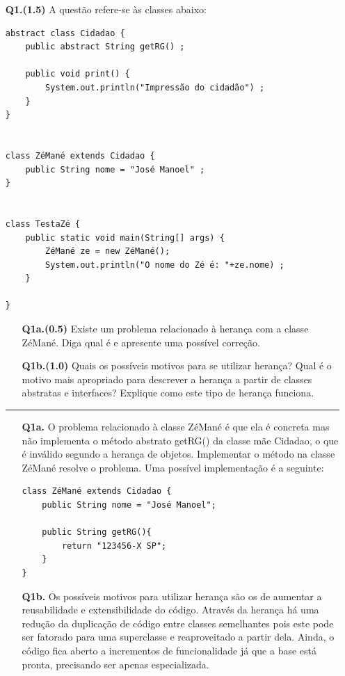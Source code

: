 \documentclass[11pt]{article}
\begin{document}
\newpage

\begin{itemize}
\item[{\bf Q1.(1.5)}]
A questão refere-se às classes abaixo:  
\begin{verbatim}
abstract class Cidadao {
    public abstract String getRG() ;

    public void print() {
        System.out.println("Impressão do cidadão") ;
    }
}


class ZéMané extends Cidadao {
    public String nome = "José Manoel" ;
}


class TestaZé {
    public static void main(String[] args) {
        ZéMané ze = new ZéMané();
        System.out.println("O nome do Zé é: "+ze.nome) ;
    }

}
\end{verbatim}

\begin{itemize}
\item[{\bf Q1a.(0.5)}] Existe um problema relacionado à herança com a classe
  ZéMané. Diga qual é e apresente uma possível correção.
\item[{\bf Q1b.(1.0)}] Quais os possíveis motivos para se utilizar herança?
  Qual é o motivo mais apropriado para descrever a herança a partir de
  classes abstratas e interfaces? Explique como este tipo de herança funciona.
\end{itemize}

\hrule
\begin{itemize}
\item[{\bf Q1a.}] O problema relacionado à classe ZéMané é que ela é concreta
mas não implementa o método abstrato getRG() da classe mãe Cidadao, o que é
inválido segundo a herança de objetos. Implementar o método na classe ZéMané
resolve o problema. Uma possível implementação é a seguinte:

\begin{verbatim}
class ZéMané extends Cidadao {
    public String nome = "José Manoel";

    public String getRG(){
        return "123456-X SP";
    }
}
\end{verbatim}

\item[{\bf Q1b.}] Os possíveis motivos para utilizar herança são os de aumentar
a reusabilidade e extensibilidade do código. Através da herança há uma redução
da duplicação de código entre classes semelhantes pois este pode ser
fatorado para uma superclasse e reaproveitado a partir dela. Ainda, o código
fica aberto a incrementos de funcionalidade já que a base está pronta,
precisando ser apenas especializada.


\end{itemize}
\end{itemize}
\end{document}
